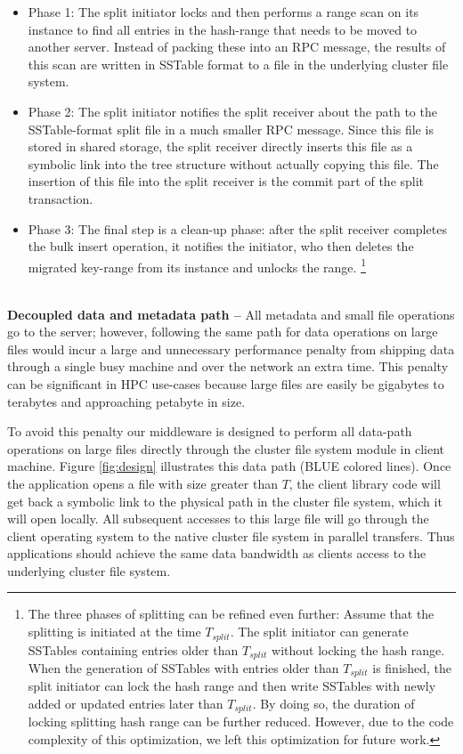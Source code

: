 \begin{itemize}
\item{Phase 1:} The split initiator locks and
then performs a range scan on its \tfs instance
to find all entries in the hash-range that needs to be moved to another server.
Instead of packing these into an RPC message,
the results of this scan are written in SSTable format to a file in the
underlying cluster file system.

\item{Phase 2:} The split initiator notifies the split receiver about
the path to the SSTable-format split file in a much smaller RPC message.
Since this file is stored in shared storage,
the split receiver directly inserts this file as a symbolic link
into the \ldb tree structure without actually copying this file.
The insertion of this file into the split receiver is the commit
part of the split transaction.

\item{Phase 3:} The final step is a clean-up phase:
after the split receiver completes the bulk insert operation, it notifies the
initiator, who then deletes the migrated key-range from its \tfs instance
and unlocks the range.
\footnote{The three phases of splitting can be refined even further:
Assume that the splitting is initiated at the time $T_{split}$.
The split initiator can generate SSTables containing entries
older than $T_{split}$ without locking the hash range.
When the generation of SSTables with entries older than $T_{split}$ is finished,
the split initiator can lock the hash range and then write SSTables with
newly added or updated entries later than $T_{split}$.
By doing so, the duration of locking splitting hash range can be further reduced.
However, due to the code complexity of this optimization,
we left this optimization for future work.}

\end{itemize}


~\\
\textbf{Decoupled data and metadata path -- }
All metadata and small file operations go to the \giga server;
however, following the same path for data operations on large files
would incur a large and unnecessary performance penalty
from shipping data through a single busy machine and
over the network an extra time.
This penalty can be significant in HPC use-cases
because large files are easily be gigabytes to terabytes
and approaching petabyte in size.

To avoid this penalty our middleware is designed to perform all
data-path operations on large files directly
through the cluster file system module in client machine.
Figure \ref{fig:design} illustrates this data path (BLUE colored lines).
Once the application opens a file with size greater than $T$,
the \sys client library code will get back a symbolic link to the physical
path in the cluster file system, which it will open locally.
All subsequent accesses to this large file will go through
the client operating system to the native cluster file system
in parallel transfers.
Thus applications should achieve the same data bandwidth as
clients access to the underlying cluster file system.


